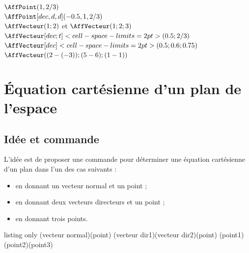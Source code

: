 \documentclass[a4paper,french,11pt]{article}
\newcommand\cmaj[1]{%
	{\tcbox[vignetteMaJ]{#1}\xspace}%
}
\begin{document}
\begin{PresCodePL}{}
$\AffPoint(1,2/3)$ \\
$\AffPoint[dec,d,d](-0.5,1,2/3)$ \\
$\AffVecteur(1;2)$ et $\AffVecteur(1;2;3)$ \\
$\AffVecteur[dec;t]<cell-space-limits=2pt>(0.5;2/3)$ \\
$\AffVecteur[dec]<cell-space-limits=2pt>(0.5;0.6;0.75)$ \\
$\AffVecteur((2-(-3));(5-6);(1-1))$
\end{PresCodePL}

\newpage

\section{Équation cartésienne d'un plan de l'espace}\label{eqcartplan}

\subsection{Idée et commande}

\begin{tipblock}
\cmaj{2.6.4} L'idée est de proposer une commande pour déterminer une équation cartésienne d'un plan dans l'un des cas suivants :

\begin{itemize}
	\item en donnant un vecteur normal et un point ;
	\item en donnant deux vecteurs directeurs et un point ;
	\item en donnant trois points.
\end{itemize}
\vspace*{-\baselineskip}\leavevmode
\end{tipblock}

\begin{PresCodeTexPL}{listing only}
\TrouveEqCartPlan[clés](vecteur normal)(point)
\TrouveEqCartPlan[clés](vecteur dir1)(vecteur dir2)(point)
\TrouveEqCartPlan[clés](point1)(point2)(point3)
\end{PresCodeTexPL}
\end{document}
